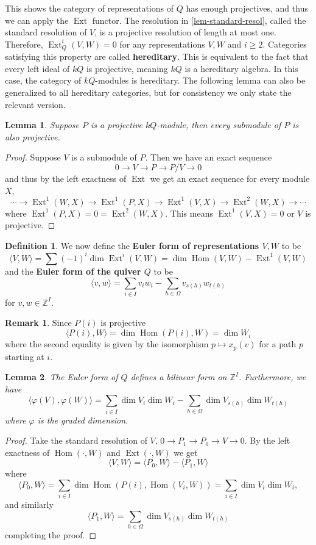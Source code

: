 \documentclass[12pt]{report}
\newtheorem{lemma}{Lemma}[section]
\theoremstyle{remark}
\theoremstyle{definition}
\newtheorem{remark}{Remark}[section]
\newtheorem{definition}{Definition}[section]
\newcommand{\Z}[0]{\mathbb{Z}}
\newcommand{\Hom}[0]{\operatorname{Hom}}
\newcommand{\Ext}{\operatorname{Ext}}
\begin{document}
    This shows the category of representations of $Q$ has enough projectives, and thus we can apply the $\Ext$ functor. The resolution in \autoref{lem-standard-resol}, called the standard resolution of $V$, is a projective resolution of length at most one. Therefore, $\Ext^i_Q(V, W)=0$ for any representations $V, W$ and $i\geqslant 2$. Categories satisfying this property are called \textbf{hereditary}. This is equivalent to the fact that every left ideal of $kQ$ is projective, meaning $kQ$ is a hereditary algebra. In this case, the category of $kQ$-modules is hereditary. The following lemma can also be generalized to all hereditary categories, but for consistency we only state the relevant version.
    \begin{lemma}
        Suppose $P$ is a projective $kQ$-module, then every submodule of $P$ is also projective.
    \end{lemma}
    \begin{proof}
        Suppose $V$ is a submodule of $P$. Then we have an exact sequence
        \[0\to V\to P\to P/V\to 0\]
        and thus by the left exactness of $\Ext$ we get an exact sequence for every module $X$,
        \[\cdots\to\Ext^1(W, X)\to \Ext^1(P,X)\to \Ext^1(V, X)\to \Ext^2(W, X)\to\cdots\]
        where $\Ext^1(P,X)=0=\Ext^2(W, X)$. This means $\Ext^1(V, X)=0$ or $V$ is projective.
    \end{proof}
    \begin{definition}
        We now define the \textbf{Euler form of representations $V,W$} to be
        \[\langle V, W\rangle=\sum(-1)^i\dim\Ext^i(V, W)=\dim\Hom(V, W)-\Ext^1(V, W)\]
        and the \textbf{Euler form of the quiver $Q$} to be
        \[\langle v, w\rangle=\sum_{i\in I} v_iw_i-\sum_{h\in\Omega} v_{s(h)}w_{t(h)}\]
        for $v,w\in\Z^I$.
    \end{definition}
    \begin{remark}
        Since $P(i)$ is projective 
        \[\langle P(i), W\rangle=\dim\Hom(P(i), W)=\dim W_i\]
        where the second equality is given by the isomorphism $p\mapsto x_p(v)$ for a path $p$ starting at $i$.
    \end{remark}
    \begin{lemma}
        The Euler form of $Q$ defines a bilinear form on $\Z^I$. Furthermore, we have
        \[\langle \varphi(V), \varphi(W)\rangle=\sum_{i\in I}\dim V_i\dim W_i-\sum_{h\in\Omega}\dim V_{s(h)}\dim W_{t(h)}\]
        where $\varphi$ is the graded dimension.
    \end{lemma}
    \begin{proof}
        Take the standard resolution of $V$, $0\to P_1\to P_0\to V\to 0$. By the left exactness of $\Hom(\cdot, W)$ and $\Ext(\cdot, W)$ we get
        \[\langle V, W\rangle=\langle P_0, W\rangle-\langle P_1,W\rangle\]
        where
        \[\langle P_0, W\rangle=\sum_{i\in I}\dim\Hom(P(i),\Hom(V_i, W))=\sum_{i\in I}\dim V_i\dim W_i,\]
        and similarly
        \[\langle P_1, W\rangle=\sum_{h\in\Omega}\dim V_{s(h)}\dim W_{t(h)}\]
        completing the proof.
    \end{proof}
\end{document}
